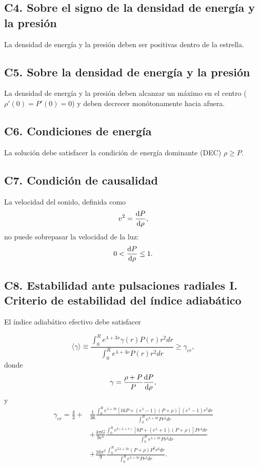 \subsection*{C4. Sobre el signo de la densidad de energía y la presión}
La densidad de energía y la presión deben ser positivas dentro de la estrella.

\subsection*{C5. Sobre la densidad de energía y la presión}
La densidad de energía y la presión deben alcanzar un máximo en el centro ($\rho'(0)=P'(0)=0$) y deben decrecer monótonamente hacia afuera.

\subsection*{C6. Condiciones de energía}
La solución debe satisfacer la condición de energía dominante (DEC) $\rho \geq P$.
\subsection*{C7. Condición de causalidad}
La velocidad del sonido, definida como
\begin{equation}
    v^2=\dv{P}{\rho},
\end{equation}
no puede sobrepasar la velocidad de la luz:
\begin{equation}
    0 < \dv{P}{\rho} \leq 1 .
\end{equation}

\subsection*{C8. Estabilidad ante pulsaciones radiales I. Criterio de estabilidad del índice adiabático } 
\noindent El índice adiabático efectivo debe satisfacer \cite{Merafina1989}

\begin{equation}
    \langle\gamma\rangle\equiv\frac{\int_{0}^{R} e^{\lambda+3 \nu} \gamma(r) P(r) r^{2} d r}{\int_{0}^{R} e^{\lambda+3 \nu} P(r) r^{2} d r} \geq \gamma_{cr},
\end{equation}
donde 
\begin{equation}
    \gamma = \frac { \rho + P  } { P } \dv{P}{\rho},
\end{equation}
y 
\begin{align}
    \gamma_{cr} = \frac{4}{3} +& \frac{1}{36} \frac{\int_{0}^{R} e^{\lambda+3 \mathrm{v}}\left[16 P+\left(e^{\lambda}-1\right)\left(P+\rho \right)\right]\left(e^{\lambda}-1\right) r^{2} d r}{\int_{0}^{R} e^{\lambda+3 \mathrm{v}} P r^{2} d r} \nonumber
    \\ &+ \frac{4 \pi G}{9 c^{4}} \frac{\int_{0}^{R} e^{3( \lambda+ \mathrm{v})}\left[8 P+\left(e^{\lambda}+1\right)\left(P+\rho \right)\right] P r^{4} d r}{\int_{0}^{R} e^{\lambda+3 \mathrm{v}} P r^{2} d r}
    \\ & + \frac{16 \pi^{2} }{9} \frac{\int_{0}^{R} e^{5 \lambda+3 v }\left(P+\rho \right) P^{2} r^{6} d r}{\int_{0}^{R} e^{\lambda+3 v } P r^{2} d r}. \nonumber
\end{align}
